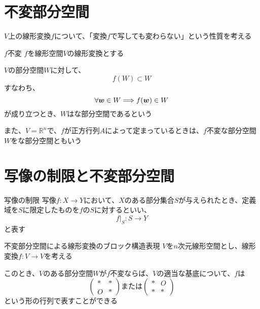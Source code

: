 \documentclass[../../../topic_linear-algebra]{subfiles}
\begin{document}
\sectionline
\section{不変部分空間}

$V$上の線形変換$f$について、「変換$f$で写しても変わらない」という性質を考える

\begin{definition}{$f$不変}
  $f$を線形空間$V$の線形変換とする

  $V$の部分空間$W$に対して、
  \begin{equation*}
    f(W) \subset W
  \end{equation*}
  すなわち、
  \begin{equation*}
    \forall\vb*{w} \in W \Longrightarrow f(\vb*{w}) \in W
  \end{equation*}
  が成り立つとき、$W$はな部分空間であるという

  \br

  また、$V=\mathbb{R}^n$で、$f$が正方行列$A$によって定まっているときは、$f$不変な部分空間$W$をな部分空間ともいう
\end{definition}

\sectionline
\section{写像の制限と不変部分空間}

\begin{definition}{写像の制限}
  写像$f\colon X \to Y$において、$X$のある部分集合$S$が与えられたとき、定義域を$S$に限定したものを$f$の$S$に対するといい、
  \begin{equation*}
    f|_S\colon S \to Y
  \end{equation*}
  と表す
\end{definition}

\sectionline

\begin{theorem}{不変部分空間による線形変換のブロック構造表現}
  $V$を$n$次元線形空間とし、線形変換$f\colon V \to V$を考える

  このとき、$V$のある部分空間$W$が$f$不変ならば、$V$の適当な基底について、$f$は
  \begin{equation*}
    \begin{pmatrix}
      * & * \\
      O & *
    \end{pmatrix} \text{または}
    \begin{pmatrix}
      * & O \\
      * & *
    \end{pmatrix}
  \end{equation*}
  という形の行列で表すことができる
\end{theorem}
\end{document}
